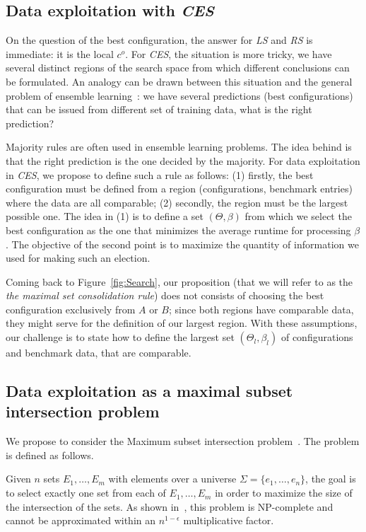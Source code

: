 \documentclass[10pt, conference, compsocconf]{IEEEtran}
\begin{document}
\subsection{Data exploitation with {\it CES}}

On the question of the best configuration, the answer for {\it LS} and {\it RS} is immediate: it is the local $c^o$. For {\it CES}, 
the situation is more tricky, we have several distinct regions of the search space from which different conclusions can be formulated. 
An analogy can be drawn between this situation and the general problem of ensemble learning~\cite{DBLP:books/daglib/0087929}:
we have several predictions (best configurations) that can be issued from different set of training data, what is 
the right prediction?

Majority rules are often used in ensemble learning problems. The idea behind is that the right prediction is the one decided by 
the majority. For data exploitation in {\it CES}, we propose to define such a rule as 
follows: (1) firstly, the best configuration must be 
defined from a region (configurations, benchmark entries)  where the data are all comparable; (2) secondly, the region must be the largest possible one. 
The idea in (1) is to define a set $(\Theta, \beta)$ from which we select the best configuration 
as the one that minimizes the average runtime for processing $\beta$. The objective of the second point is to maximize 
the quantity of information we used for making such an election.

Coming back to Figure~\ref{fig:Search}, our proposition (that we will refer to as  the
 {\it the maximal set consolidation rule}) does not consists of choosing the best configuration exclusively 
from $A$ or $B$; since both regions have comparable data, they might serve for the definition of our largest region. 
With these assumptions, our challenge is to state how to define the largest set  $(\Theta_l, \beta_l)$ 
of configurations and benchmark data, that are comparable.

\subsection{Data exploitation as a maximal subset intersection problem}

We propose to consider the  Maximum subset intersection problem~\cite{Clifford:2011:MSI:1930546.1930773}. 
The problem is defined as follows.


Given $n$ sets $E_1,\dots,E_m$ with elements over a universe $\Sigma = \{ e_1,\dots,e_n  \}$, the goal is to select 
exactly one set from each of $E_1,\dots,E_m$ in order to maximize the size of the intersection of the sets.
As shown in~\cite{Clifford:2011:MSI:1930546.1930773}, this problem is NP-complete and cannot be approximated within 
an $n^{1-\epsilon}$ multiplicative factor.
\end{document}

